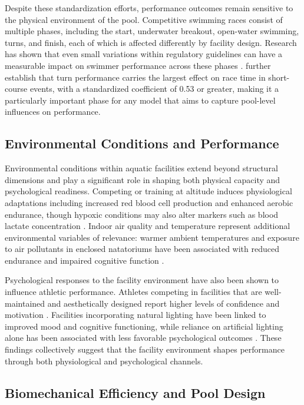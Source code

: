 \documentclass[12pt]{article}
\begin{document}
Despite these standardization efforts, performance outcomes remain sensitive to
the physical environment of the pool. Competitive swimming races consist of
multiple phases, including the start, underwater breakout, open-water swimming,
turns, and finish, each of which is affected differently by facility design.
Research has shown that even small variations within regulatory guidelines can
have a measurable impact on swimmer performance across these phases
\parencite{marinho2020, morais2019, nicol2021, veiga2016}. \textcite{born2022}
further establish that turn performance carries the largest effect on race time
in short-course events, with a standardized coefficient of 0.53 or greater,
making it a particularly important phase for any model that aims to capture
pool-level influences on performance.

\subsection{Environmental Conditions and Performance}

Environmental conditions within aquatic facilities extend beyond structural
dimensions and play a significant role in shaping both physical capacity and
psychological readiness. Competing or training at altitude induces physiological
adaptations including increased red blood cell production and enhanced aerobic
endurance, though hypoxic conditions may also alter markers such as blood
lactate concentration \parencite{perrimoore2015}. Indoor air quality and
temperature represent additional environmental variables of relevance: warmer
ambient temperatures and exposure to air pollutants in enclosed natatoriums have
been associated with reduced endurance and impaired cognitive function
\parencite{sargeant2016}.

Psychological responses to the facility environment have also been shown to
influence athletic performance. Athletes competing in facilities that are
well-maintained and aesthetically designed report higher levels of confidence
and motivation \parencite{alasinrin2024, lynch2018}. Facilities incorporating
natural lighting have been linked to improved mood and cognitive functioning,
while reliance on artificial lighting alone has been associated with less
favorable psychological outcomes \parencite{scanlan2016}. These findings
collectively suggest that the facility environment shapes performance through
both physiological and psychological channels.

\subsection{Biomechanical Efficiency and Pool Design}
\end{document}
